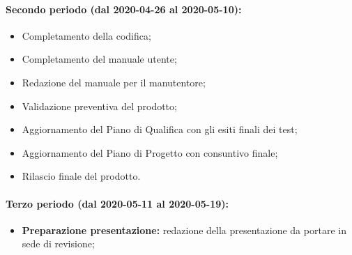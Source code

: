 				\paragraph{Secondo periodo (dal 2020-04-26 al 2020-05-10):}
				
					\begin{itemize}
						\item Completamento della codifica;
						\item Completamento del manuale utente;
						\item Redazione del manuale per il manutentore;
						\item Validazione preventiva del prodotto;
						\item Aggiornamento del Piano di Qualifica con gli esiti finali dei test;
						\item Aggiornamento del Piano di Progetto con consuntivo finale;
						\item Rilascio finale del prodotto.
					\end{itemize}
		
				\paragraph{Terzo periodo (dal 2020-05-11 al 2020-05-19):}
				
					\begin{itemize}
						\item \textbf{Preparazione presentazione:} redazione della presentazione da portare in sede di revisione;
					\end{itemize}
	
